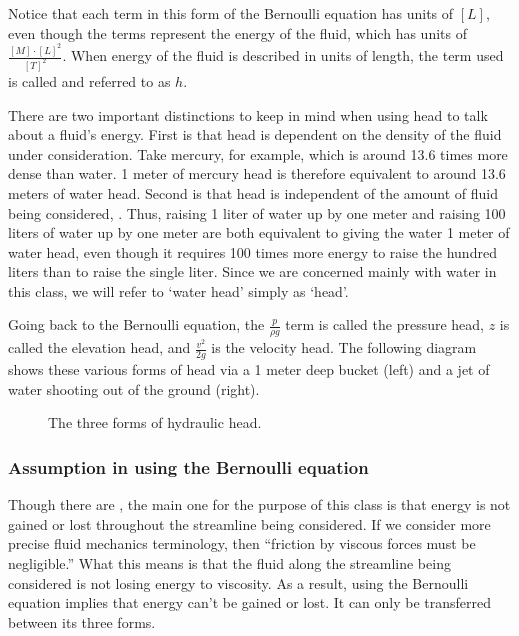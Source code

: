 \documentclass[letterpaper,10pt,english]{sphinxmanual}
\let\sphinxpxdimen\pdfpxdimen\else\newdimen\sphinxpxdimen
\begin{document}
Notice that each term in this form of the Bernoulli equation has units of \([L]\), even though the terms represent the energy of the fluid, which has units of \(\frac{[M] \cdot [L]^2}{[T]^2}\). When energy of the fluid is described in units of length, the term used is called  and referred to as \(h\).

There are two important distinctions to keep in mind when using head to talk about a fluid’s energy. First is that head is dependent on the density of the fluid under consideration. Take mercury, for example, which is around 13.6 times more dense than water. 1 meter of mercury head is therefore equivalent to around 13.6 meters of water head. Second is that head is independent of the amount of fluid being considered, . Thus, raising 1 liter of water up by one meter and raising 100 liters of water up by one meter are both equivalent to giving the water 1 meter of water head, even though it requires 100 times more energy to raise the hundred liters than to raise the single liter. Since we are concerned mainly with water in this class, we will refer to ‘water head’ simply as ‘head’.

Going back to the Bernoulli equation, the \(\frac{p}{\rho g}\) term is called the pressure head, \(z\) is called the elevation head, and \(\frac{v^2}{2g}\) is the velocity head. The following diagram shows these various forms of head via a 1 meter deep bucket (left) and a jet of water shooting out of the ground (right).

\begin{figure}[htbp]
\centering
\capstart

\noindent\sphinxincludegraphics[width=650\sphinxpxdimen]{{different_forms_of_head}.png}
\caption{The three forms of hydraulic head.}\label{\detokenize{Review/Review_Fluid_Mechanics:id5}}\label{\detokenize{Review/Review_Fluid_Mechanics:figure-different-forms-of-head}}\end{figure}


\subsubsection{Assumption in using the Bernoulli equation}
\label{\detokenize{Review/Review_Fluid_Mechanics:assumption-in-using-the-bernoulli-equation}}
Though there are , the main one for the purpose of this class is that energy is not gained or lost throughout the streamline being considered. If we consider more precise fluid mechanics terminology, then “friction by viscous forces must be negligible.” What this means is that the fluid along the streamline being considered is not losing energy to viscosity. As a result, using the Bernoulli equation implies that energy can’t be gained or lost. It can only be transferred between its three forms.
\end{document}
